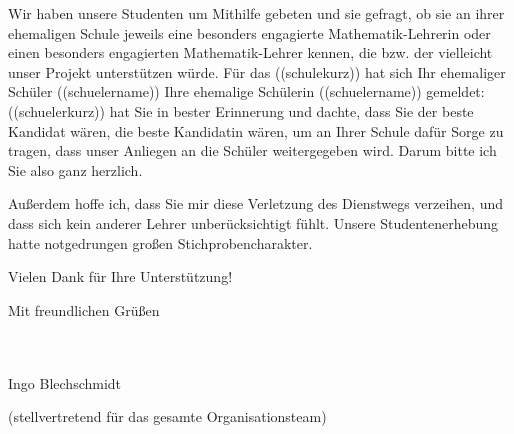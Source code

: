 \documentclass{../../zirkelbrief}
\begin{document}
Wir haben unsere Studenten um Mithilfe gebeten und sie gefragt, ob sie an ihrer
ehemaligen Schule jeweils eine besonders engagierte Mathematik-Lehrerin oder einen besonders
engagierten Mathematik-Lehrer kennen, die bzw. der
vielleicht unser Projekt unterstützen würde. Für das ((schulekurz)) hat sich
\ifschuelermaennlich Ihr ehemaliger Schüler ((schuelername)) \else
Ihre ehemalige Schülerin ((schuelername)) \fi
gemeldet: ((schuelerkurz)) hat Sie in bester
Erinnerung und dachte, dass Sie \iflehrermaennlich der beste Kandidat wären,
\else die beste Kandidatin wären, \fi um an Ihrer Schule dafür Sorge zu tragen,
dass unser Anliegen an die Schüler weitergegeben wird. Darum bitte ich Sie also
ganz herzlich.

Außerdem hoffe ich, dass Sie mir diese Verletzung des Dienstwegs verzeihen, und
dass sich kein anderer Lehrer unberücksichtigt fühlt. Unsere Studentenerhebung
hatte notgedrungen großen Stichprobencharakter.

Vielen Dank für Ihre Unterstützung!

Mit freundlichen Grüßen

\ \\
\ \\

Ingo Blechschmidt

\vspace{-0.2cm}

{\small (stellvertretend für das gesamte Organisationsteam)}
\end{document}
